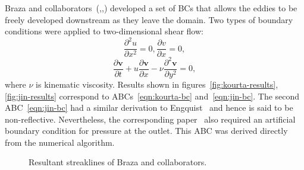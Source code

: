 \documentclass{article}
\begin{document}
Braza and collaborators~(\cite{Jin:1993},\cite{Kourta:1987},\cite{Persillon:1998}) developed a set of BCs that allows the eddies to be freely developed downstream as they leave the domain.  Two types of boundary conditions were applied to two-dimensional shear flow: 
\begin{equation}\label{eqn:kourta-bc}
	\frac{\partial ^2u}{\partial x^2}=0,\frac{\partial v}{\partial x	}=0,
\end{equation}
\begin{equation}\label{eqn:jin-bc}
	\frac{\partial \boldsymbol{v}}{\partial t}+u\frac{\partial \boldsymbol{v}}{\partial x}-\nu \frac{\partial^2 \boldsymbol{v}}{\partial y^2}=0,
\end{equation}
where $\nu$ is kinematic viscosity. 
Results shown in figures~\ref{fig:kourta-results}, \ref{fig:jin-results} correspond to ABCs~\eqref{eqn:kourta-bc} and~\eqref{eqn:jin-bc}.
The second ABC~\eqref{eqn:jin-bc} had a similar derivation to Engquist~\cite{Engquist:1977} and hence is said to be non-reflective. Nevertheless, the corresponding paper~\cite{Jin:1993} also required an artificial boundary condition for pressure at the outlet. This ABC was derived directly from the numerical algorithm.
\begin{figure}
\centering
   \quad
\caption{\small Resultant streaklines of Braza and collaborators.}
\end{figure}
\end{document}
